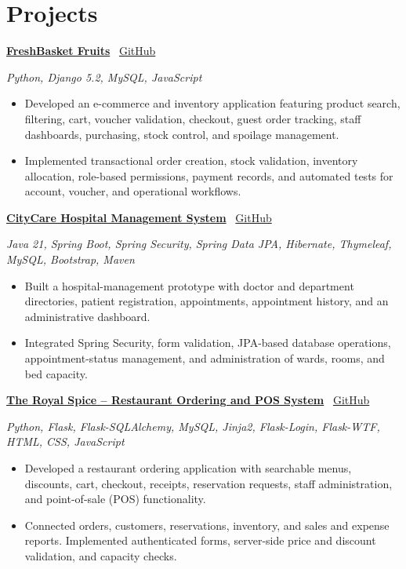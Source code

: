 \documentclass[a4paper,10pt]{article}
\newcommand{\projecttitle}[2]{%
    \Needspace{9\baselineskip}%
    \vspace{3pt}%
    \textbf{\href{#2}{#1}}%
    \hfill
    \faGithub\ \href{#2}{GitHub}%
    \par
}
\newcommand{\techstack}[1]{%
    {\fontsize{8.5}{10}\selectfont\itshape #1\par}
}
\begin{document}

\section*{Projects}

\projecttitle
{FreshBasket Fruits}
{https://github.com/fahim-fardin-1045/freshbasket}

\techstack{Python, Django 5.2, MySQL, JavaScript}

\begin{itemize}
    \item Developed an e-commerce and inventory application featuring
    product search, filtering, cart, voucher validation, checkout,
    guest order tracking, staff dashboards, purchasing, stock control,
    and spoilage management.

    \item Implemented transactional order creation, stock validation,
    inventory allocation, role-based permissions, payment records,
    and automated tests for account, voucher, and operational workflows.
\end{itemize}

\projecttitle
{CityCare Hospital Management System}
{https://github.com/fahim-fardin-1045/city-care-hospital-management-system}

\techstack{Java 21, Spring Boot, Spring Security, Spring Data JPA,
Hibernate, Thymeleaf, MySQL, Bootstrap, Maven}

\begin{itemize}
    \item Built a hospital-management prototype with doctor and
    department directories, patient registration, appointments,
    appointment history, and an administrative dashboard.

    \item Integrated Spring Security, form validation, JPA-based
    database operations, appointment-status management, and
    administration of wards, rooms, and bed capacity.
\end{itemize}

\projecttitle
{The Royal Spice -- Restaurant Ordering and POS System}
{https://github.com/fahim-fardin-1045/The-Royel-Spice}

\techstack{Python, Flask, Flask-SQLAlchemy, MySQL, Jinja2,
Flask-Login, Flask-WTF, HTML, CSS, JavaScript}

\begin{itemize}
    \item Developed a restaurant ordering application with searchable
    menus, discounts, cart, checkout, receipts, reservation requests,
    staff administration, and point-of-sale (POS) functionality.

    \item Connected orders, customers, reservations, inventory,
    and sales and expense reports. Implemented authenticated forms,
    server-side price and discount validation, and capacity checks.
\end{itemize}
\end{document}

